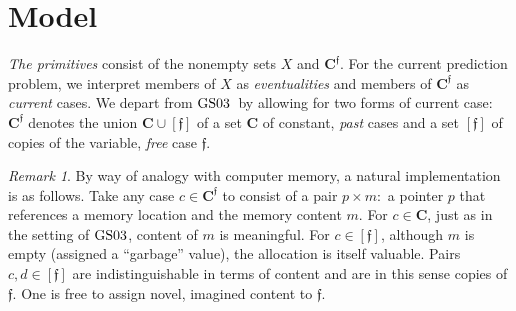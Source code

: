 \documentclass[ecta,nameyear,draft]{econsocart}
\newcommand{\novel}{\mathfrak f}
\newcommand{\mbbc}{{\mathbf C}}
\newcommand{\mbbcp}{{\mathbf C^{\novel}}}
\newcommand{\gsii}{$\textup{GS03}$}
\theoremstyle{plain}
\theoremstyle{remark}
\newtheorem*{remark*}{Remark}
\begin{document}
\section{Model}\label{sec-model}
\emph{The primitives} consist of the nonempty sets $X$ and
$\mbbcp$.  For the current prediction problem, we interpret members of $X$ as
\emph{eventualities} and members of $\mbbcp$ as \emph{current} cases. We depart
from \gsii\ by allowing for two forms of current case: $\mbbcp$ denotes the
union $\mbbc \cup [\novel]$ of a set $\mbbc$ of constant, \emph{past} cases and
a set $[\novel]$ of copies of the variable, \emph{free} case $\novel$.
\begin{remark*}
  By way of analogy with computer memory, a natural implementation is as
  follows.  Take any case $c \in \mbbcp$ to consist of a pair $p \times m:$ a
  pointer $p$ that references a memory location and the memory content $m$. For
  $c\in \mbbc$, just as in the setting of \gsii, content of $m$ is meaningful. 
  For $c \in [\novel]$, although $m$ is empty (assigned a ``garbage'' value),
  the allocation is itself valuable. Pairs $c, d\in [\novel]$ are
  indistinguishable in terms of content and are in this sense copies of
  $\novel$. One is free to assign novel, imagined content to $\novel$.
\end{remark*}
\end{document}
